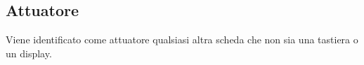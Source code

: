 \documentclass[italian]{article}
\begin{document}
    \subsection*{Attuatore}
    
    Viene identificato come attuatore qualsiasi altra scheda che non sia una tastiera o un display. 
    
%    
%    
%    
%       
%       
\end{document}

